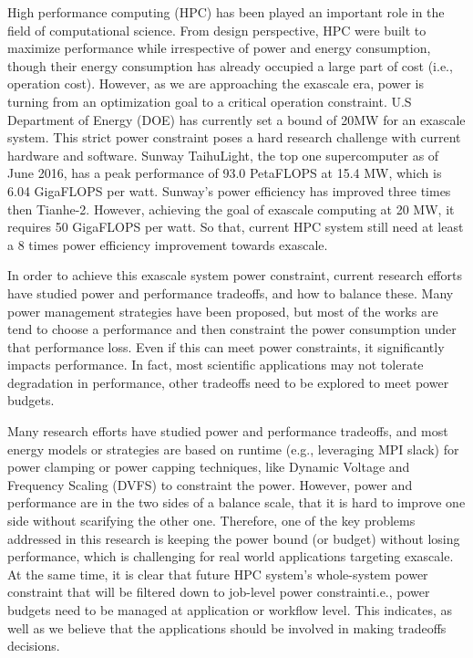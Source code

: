 \label{Section:introduction}

High performance computing (HPC) has been played an important role in the field of computational science. From design perspective, HPC were built to maximize performance while irrespective of power and energy consumption, though their energy consumption has already occupied a large part of cost (i.e., operation cost). However, as we are approaching the exascale era, power is turning from an optimization goal to a critical operation constraint. U.S Department of Energy (DOE) has currently set a bound of 20MW for an exascale system.\cite{tolentino2012optimist} This strict power constraint poses a hard research challenge with current hardware and software. Sunway TaihuLight, the top one supercomputer as of June 2016, has a peak performance of 93.0 PetaFLOPS at 15.4 MW, which is 6.04 GigaFLOPS per watt. Sunway's power efficiency has improved three times then Tianhe-2. However, achieving the goal of exascale computing at 20 MW, it requires 50 GigaFLOPS per watt. So that, current HPC system still need at least a 8 times power efficiency improvement towards exascale. 

In order to achieve this exascale system power constraint, current research efforts have studied power and performance tradeoffs, and how to balance these.\cite{ge2007cpu,hsu2005power,huang2009energy,freeh2005using,donofrio2009energy,gamell2013exploring} Many power management strategies have been proposed\cite{rountree2009adagio,lim2006adaptive,ioannou2011phase,li2010hybrid,rodero2010investigating}, but most of the works are tend to choose a performance and then constraint the power consumption under that performance loss. Even if this can meet power constraints, it significantly impacts performance. In fact, most scientific applications may not tolerate degradation in performance, other tradeoffs need to be explored to meet power budgets. 





Many research efforts have studied power and performance tradeoffs, and most energy models or strategies are based on runtime (e.g., leveraging MPI slack) for power clamping or power capping techniques, like Dynamic Voltage and Frequency Scaling (DVFS) to constraint the power. However, power and performance are in the two sides of a balance scale, that it is hard to improve one side without scarifying the other one. Therefore, one of the key problems addressed in this research is keeping the power bound (or budget) without losing performance, which is challenging for real world applications targeting exascale. At the same time, it is clear that future HPC system's whole-system power constraint that will be filtered down to job-level power constrainti.e., power budgets need to be managed at application or workflow level. This indicates, as well as we believe that the applications should be involved in making tradeoffs decisions. 

